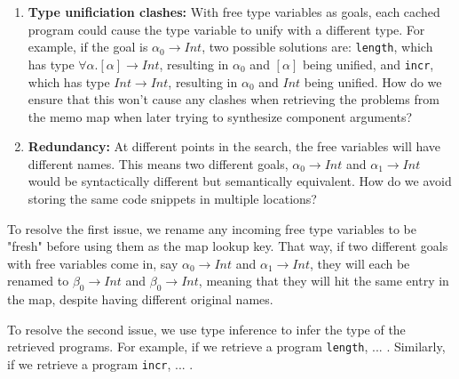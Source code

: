 \documentclass[acmsmall,nonacm]{acmart}
\begin{document}
\begin{enumerate}
  \item \textbf{Type unificiation clashes:} With free type variables as
        goals, each cached program could cause the
        type variable to unify with a different type. For example,
        if the goal is $\alpha_0 \to Int$, two possible solutions
        are: \verb|length|, which has type $\forall \alpha . [\alpha] \to Int$,
        resulting in $\alpha_0$ and $[\alpha]$ being unified, and 
        \verb|incr|, which has type $Int \to Int$,
        resulting in $\alpha_0$ and $Int$ being unified. How do we ensure 
        that this won't cause any clashes when retrieving the problems from 
        the memo map when later trying to synthesize component arguments?
  \item \textbf{Redundancy:} At different points in the search, the free
        variables will have different names. This means two different goals,
        $\alpha_0 \to Int$ and $\alpha_1 \to Int$ would be syntactically different
        but semantically equivalent. How do we avoid storing the same code 
        snippets in multiple locations? 
\end{enumerate}

To resolve the first issue, we rename any incoming free type variables 
to be "fresh" before using them as the map lookup key. That way, if 
two different goals with free variables come in, say $\alpha_0 \to Int$ and 
$\alpha_1 \to Int$, they will each be renamed to $\beta_0 \to Int$ 
and $\beta_0 \to Int$, meaning that they will hit the same entry in the map,
despite having different original names.

To resolve the second issue, we use type inference to infer the type of 
the retrieved programs. For example, if we retrieve a program \verb|length|, 
... . %
Similarly, if we retrieve a program \verb|incr|, 
... . %



\end{document}
